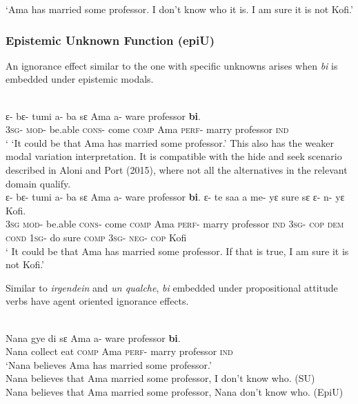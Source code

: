 \documentclass[output=paper,modfonts]{langsci/langscibook}
\begin{document}
\glt `Ama has married some professor. I don't know who it is. I am sure it is not Kofi.' 
\z 

\subsubsection{Epistemic Unknown Function (epiU)}
An ignorance effect similar to the one with specific unknowns arises when \emph{bi} is embedded under epistemic modals.

\ea\label{ex42}\\
 \gll  ε- bε- tumi a- ba sε Ama a- ware professor \textbf{bi}. 
\\
\textsc{3sg}- \textsc{mod}- be.able \textsc{cons}- come \textsc{comp} Ama \textsc{perf}- marry professor \textsc{ind} \\
    
\glt ` `It could be that Ama has married some professor.' 
\z 
This also has the weaker modal variation interpretation. It is compatible with the hide and seek scenario described in Aloni and Port (2015), where not all the alternatives in the relevant domain qualify.
\ea\label{ex42}\\
 \gll  ε- bε- tumi a- ba sε Ama a- ware professor \textbf{bi}. ε- te saa a  me- yε sure sε ε- n- yε Kofi. \\
\textsc{3sg} 
 \textsc{mod}- be.able \textsc{cons}- come \textsc{comp} Ama \textsc{perf}- marry professor \textsc{ind} \textsc{3sg}- \textsc{cop} \textsc{dem} \textsc{cond} \textsc{1sg}- do sure \textsc{comp}  \textsc{3sg}- \textsc{neg}- \textsc{cop} Kofi\\
\glt ` It could be that Ama has married some professor. If that is true, I am sure it is not Kofi.' 
\z 

Similar to \emph{irgendein} and \emph{un qualche}, \emph{bi} embedded under propositional attitude verbs have agent oriented ignorance effects.  

 \ea\label{ex42}\\
 \gll  Nana gye di sε Ama a- ware professor \textbf{bi}. \\
Nana collect eat \textsc{comp} Ama \textsc{perf}- marry professor \textsc{ind}\\
\glt `Nana believes Ama has married some professor.' \\
Nana believes that Ama married some professor, I don't know who. (SU)\\
Nana believes that Ama married some professor, Nana don't know who. (EpiU)
\z 
\end{document}

